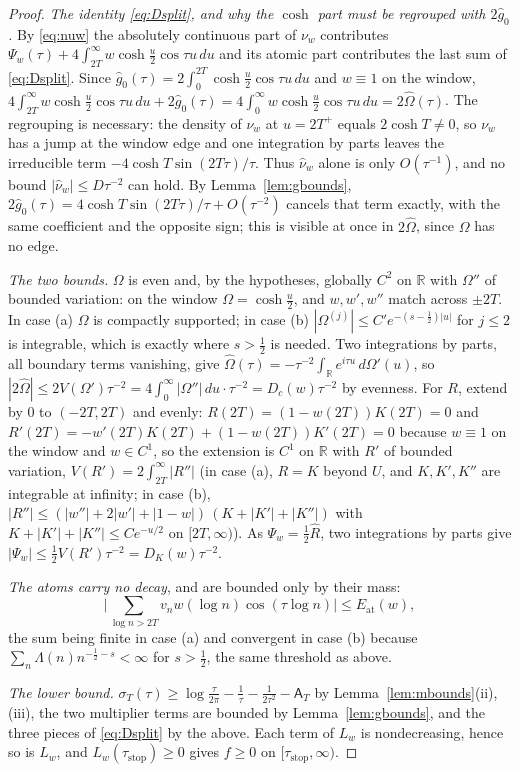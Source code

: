 \documentclass[11pt]{amsart}
\theoremstyle{definition}
\theoremstyle{remark}
\newcommand{\R}{\mathbb R}
\newcommand{\sT}{\sigma_T}
\newcommand{\gh}[1]{\widehat g_{#1}}
\newcommand{\nuh}{\widehat\nu}
\newcommand{\Aconst}{\mathsf A_T}
\begin{document}
\begin{proof}
\emph{The identity \eqref{eq:Dsplit}, and why the $\cosh$ part must be regrouped with $2\gh0$.}
By \eqref{eq:nuw} the absolutely continuous part of $\nu_w$ contributes
$\Psi_w(\tau)+4\int_{2T}^\infty w\cosh\frac u2\cos\tau u\,du$ and its atomic part contributes the
last sum of \eqref{eq:Dsplit}. Since $\gh0(\tau)=2\int_0^{2T}\cosh\frac u2\cos\tau u\,du$ and
$w\equiv1$ on the window, $4\int_{2T}^\infty w\cosh\frac u2\cos\tau u\,du+2\gh0(\tau)
=4\int_0^\infty w\cosh\frac u2\cos\tau u\,du=2\widehat\Omega(\tau)$. The regrouping is necessary: the
density of $\nu_w$ at $u=2T^+$ equals $2\cosh T\ne0$, so $\nu_w$ has a jump at the window edge and
one integration by parts leaves the irreducible term $-4\cosh T\sin(2T\tau)/\tau$. Thus $\nuh_w$
alone is only $O(\tau^{-1})$, and no bound $|\nuh_w|\le D\tau^{-2}$ can hold. By
Lemma~\ref{lem:gbounds}, $2\gh0(\tau)=4\cosh T\sin(2T\tau)/\tau+O(\tau^{-2})$ cancels that term
exactly, with the same coefficient and the opposite sign; this is visible at once in
$2\widehat\Omega$, since $\Omega$ has no edge.

\emph{The two bounds.} $\Omega$ is even and, by the hypotheses, globally $C^2$ on $\R$ with $\Omega''$ of
bounded variation: on the window $\Omega=\cosh\frac u2$, and $w,w',w''$ match across $\pm2T$. In case
(a) $\Omega$ is compactly supported; in case (b) $|\Omega^{(j)}|\le C'e^{-(s-\frac12)|u|}$ for $j\le2$ is
integrable, which is exactly where $s>\frac12$ is needed. Two integrations by parts, all boundary
terms vanishing, give $\widehat\Omega(\tau)=-\tau^{-2}\int_\R e^{i\tau u}\,d\Omega'(u)$, so
$|2\widehat\Omega|\le2V(\Omega')\tau^{-2}=4\int_0^\infty|\Omega''|\,du\cdot\tau^{-2}=D_c(w)\tau^{-2}$ by evenness.
For $R$, extend by $0$ to $(-2T,2T)$ and evenly: $R(2T)=(1-w(2T))K(2T)=0$ and
$R'(2T)=-w'(2T)K(2T)+(1-w(2T))K'(2T)=0$ because $w\equiv1$ on the window and $w\in C^1$, so the
extension is $C^1$ on $\R$ with $R'$ of bounded variation, $V(R')=2\int_{2T}^\infty|R''|$ (in case
(a), $R=K$ beyond $U$, and $K,K',K''$ are integrable at infinity; in case (b),
$|R''|\le(|w''|+2|w'|+|1-w|)\,(K+|K'|+|K''|)$ with $K+|K'|+|K''|\le Ce^{-u/2}$ on $[2T,\infty)$). As $\Psi_w=\frac12\widehat R$,
two integrations by parts give $|\Psi_w|\le\frac12V(R')\tau^{-2}=D_K(w)\tau^{-2}$.

\emph{The atoms carry no decay}, and are bounded only by their mass:
\[
\Big|\sum_{\log n>2T}v_nw(\log n)\cos(\tau\log n)\Big|\le E_{\mathrm{at}}(w),
\]
the sum being finite in case
(a) and convergent in case (b) because $\sum_n\Lambda(n)n^{-\frac12-s}<\infty$ for $s>\frac12$,
the same threshold as above.

\emph{The lower bound.} $\sT(\tau)\ge\log\frac\tau{2\pi}-\frac1\tau-\frac1{2\tau^2}-\Aconst$ by
Lemma~\ref{lem:mbounds}(ii),(iii), the two multiplier terms are bounded by Lemma~\ref{lem:gbounds},
and the three pieces of \eqref{eq:Dsplit} by the above. Each term of $L_w$ is nondecreasing, hence so
is $L_w$, and $L_w(\tau_{\mathrm{stop}})\ge0$ gives $f\ge0$ on $[\tau_{\mathrm{stop}},\infty)$.
\end{proof}
\end{document}
